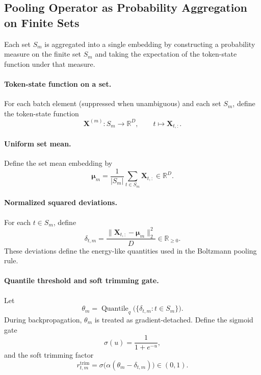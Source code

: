 \documentclass{article}
\theoremstyle{plain}
\theoremstyle{definition}
\theoremstyle{remark}
\begin{document}
\subsection{Pooling Operator as Probability Aggregation on Finite Sets}
\label{sec:pooling-operator}

Each set $S_m$ is aggregated into a single embedding by constructing a probability measure on the finite set $S_m$ and taking the expectation of the token-state function under that measure.

\paragraph{Token-state function on a set.}
For each batch element (suppressed when unambiguous) and each set $S_m$, define the token-state function
\begin{equation}
\label{eq:set-token-function}
\mathbf X^{(m)}:S_m\to\mathbb R^D,
\qquad
t\mapsto \mathbf X_{t,:}.
\end{equation}

\paragraph{Uniform set mean.}
Define the set mean embedding by
\begin{equation}
\label{eq:set-mean}
\boldsymbol\mu_m=\frac{1}{|S_m|}\sum_{t\in S_m}\mathbf X_{t,:}
\in\mathbb R^D.
\end{equation}

\paragraph{Normalized squared deviations.}
For each $t\in S_m$, define
\begin{equation}
\label{eq:normalized-deviation}
\delta_{t,m}=\frac{\|\mathbf X_{t,:}-\boldsymbol\mu_m\|_2^2}{D}\in\mathbb R_{\ge 0}.
\end{equation}
These deviations define the energy-like quantities used in the Boltzmann pooling rule.

\paragraph{Quantile threshold and soft trimming gate.}
Let
\begin{equation}
\label{eq:trimming-threshold}
\theta_m=\operatorname{Quantile}_q\bigl(\{\delta_{t,m}:t\in S_m\}\bigr).
\end{equation}
During backpropagation, $\theta_m$ is treated as gradient-detached. Define the sigmoid gate
\begin{equation}
\label{eq:sigmoid}
\sigma(u)=\frac{1}{1+e^{-u}},
\end{equation}
and the soft trimming factor
\begin{equation}
\label{eq:trimming-gate}
r^{\mathrm{trim}}_{t,m}=\sigma\bigl(\alpha(\theta_m-\delta_{t,m})\bigr)\in(0,1).
\end{equation}
\end{document}
